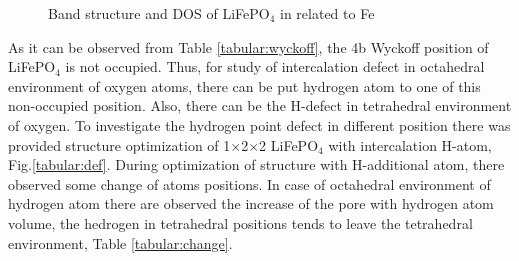 \begin{figure}[h]
\begin{minipage}[h]{1\linewidth}
\end{minipage}
\caption{Band structure and DOS of LiFePO$_4$ in related to Fe}
\label{dos}
\end{figure}

As it can be observed from Table \ref{tabular:wyckoff}, the 4b Wyckoff position of LiFePO$_4$ is not occupied. Thus, for study of intercalation defect in octahedral environment of oxygen atoms, there can be put hydrogen atom to one of this non-occupied position. Also, there can be the H-defect in tetrahedral environment of oxygen. To investigate the hydrogen point defect in different position there was provided structure optimization of 1$\times$2$\times$2 LiFePO$_4$ with intercalation H-atom, Fig.\ref{tabular:def}. During optimization of structure with H-additional atom, there observed some change of atoms positions. In case of octahedral environment of hydrogen atom there are observed the increase of the pore with hydrogen atom volume, the hedrogen in tetrahedral positions tends to leave the tetrahedral environment, Table \ref{tabular:change}.

